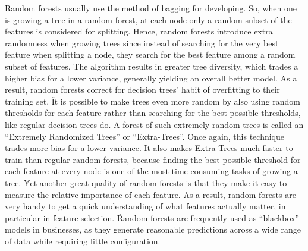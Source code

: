 Random forests usually use the method of bagging for developing. So, when one is growing a tree in a random forest,
at each node only a random subset of the features is considered for splitting. Hence, random forests introduce extra
randomness when growing trees since instead of searching for the very best feature when splitting a node, they search
for the best feature among a random subset of features. The algorithm results in greater tree diversity, which trades
a higher bias for a lower variance, generally yielding an overall better model. As a result, random forests correct
for decision trees' habit of overfitting to their training set. \v

It is possible to make trees even more random by also using random thresholds for each feature rather than searching
for the best possible thresholds, like regular decision trees do. A forest of such extremely random trees is called
an ``Extremely Randomized Trees'' or ``Extra-Trees''. Once again, this technique trades more bias for a lower variance.
It also makes Extra-Trees much faster to train than regular random forests, because finding the best possible
threshold for each feature at every node is one of the most time-consuming tasks of growing a tree. \v

Yet another great quality of random forests is that they make it easy to measure the relative importance of each
feature. As a result, random forests are very handy to get a quick understanding of what features actually matter, in
particular in feature selection. \v

Random forests are frequently used as ``blackbox'' models in businesses, as they generate reasonable predictions
across a wide range of data while requiring little configuration.